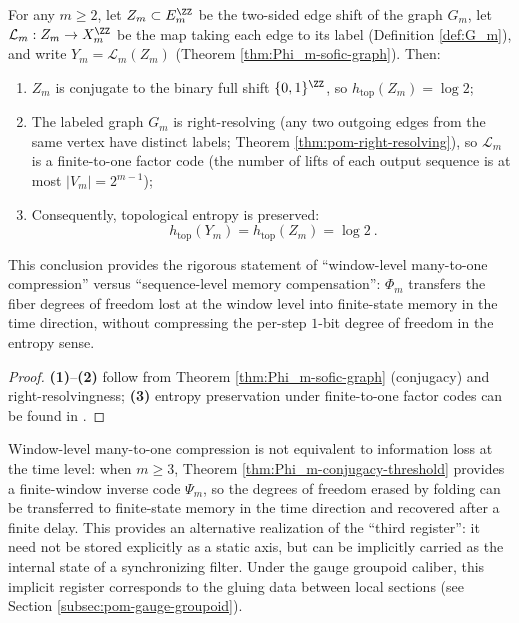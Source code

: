 \begin{corollary}\label{cor:Phi_m-entropy-no-drop}
For any \(m\ge 2\), let \(Z_m\subset E_m^{\ZZ}\) be the two-sided edge shift of the graph \(G_m\), let \(\mathcal{L}_m:Z_m\to X_m^{\ZZ}\) be the map taking each edge to its label (Definition \ref{def:G_m}), and write \(Y_m=\mathcal{L}_m(Z_m)\) (Theorem \ref{thm:Phi_m-sofic-graph}).
Then:
\begin{enumerate}
  \item \(Z_m\) is conjugate to the binary full shift \(\{0,1\}^{\ZZ}\), so \(h_{\mathrm{top}}(Z_m)=\log 2\);
  \item The labeled graph \(G_m\) is right-resolving (any two outgoing edges from the same vertex have distinct labels; Theorem \ref{thm:pom-right-resolving}), so \(\mathcal{L}_m\) is a finite-to-one factor code (the number of lifts of each output sequence is at most \(|V_m|=2^{m-1}\));
  \item Consequently, topological entropy is preserved:
  \[
  \boxed{\ h_{\mathrm{top}}(Y_m)=h_{\mathrm{top}}(Z_m)=\log 2\ }.
  \]
\end{enumerate}
This conclusion provides the rigorous statement of ``window-level many-to-one compression'' versus ``sequence-level memory compensation'': \(\Phi_m\) transfers the fiber degrees of freedom lost at the window level into finite-state memory in the time direction, without compressing the per-step \(1\)-bit degree of freedom in the entropy sense.
\end{corollary}
\begin{proof}
\textbf{(1)}--\textbf{(2)} follow from Theorem \ref{thm:Phi_m-sofic-graph} (conjugacy) and right-resolvingness; \textbf{(3)} entropy preservation under finite-to-one factor codes can be found in \cite{LindMarcus1995,Kitchens1998SymbolicDynamics}.
\end{proof}

\begin{remark}\label{rem:Phi-m-memory-implicit-register}
Window-level many-to-one compression is not equivalent to information loss at the time level: when $m\ge 3$, Theorem \ref{thm:Phi_m-conjugacy-threshold} provides a finite-window inverse code $\Psi_m$, so the degrees of freedom erased by folding can be transferred to finite-state memory in the time direction and recovered after a finite delay. This provides an alternative realization of the ``third register'': it need not be stored explicitly as a static axis, but can be implicitly carried as the internal state of a synchronizing filter. Under the gauge groupoid caliber, this implicit register corresponds to the gluing data between local sections (see Section \ref{subsec:pom-gauge-groupoid}).
\end{remark}
